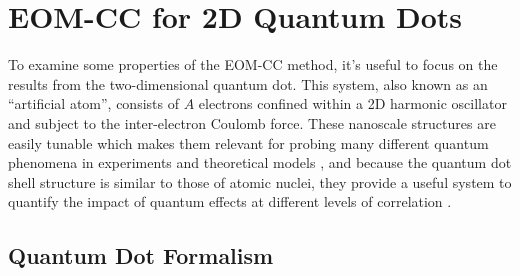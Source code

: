 \documentclass[thesis.tex]{subfiles}
\begin{document}
\section{EOM-CC for 2D Quantum Dots} \label{section:eom_qd}

To examine some properties of the EOM-CC method, it's useful to focus on the results from the two-dimensional quantum dot.  This system, also known as an ``artificial atom'', consists of $A$ electrons confined within a 2D harmonic oscillator and subject to the inter-electron Coulomb force.  These nanoscale structures are easily tunable which makes them relevant for probing many different quantum phenomena in experiments and theoretical models \cite{REIMANN2002,ENGEL1993,BIRMAN20131}, and because the quantum dot shell structure is similar to those of atomic nuclei, they provide a useful system to quantify the impact of quantum effects at different levels of correlation \cite{TARUCHA1996}.

\subsection{Quantum Dot Formalism}
\end{document}

